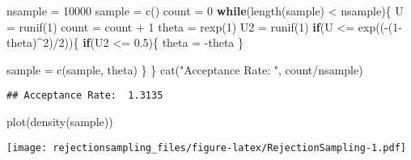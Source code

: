 \documentclass[
]{article}
\newenvironment{Shaded}{\begin{snugshade}}{\end{snugshade}}
\newcommand{\ControlFlowTok}[1]{\textcolor[rgb]{0.13,0.29,0.53}{\textbf{#1}}}
\newcommand{\DecValTok}[1]{\textcolor[rgb]{0.00,0.00,0.81}{#1}}
\newcommand{\FloatTok}[1]{\textcolor[rgb]{0.00,0.00,0.81}{#1}}
\newcommand{\FunctionTok}[1]{\textcolor[rgb]{0.00,0.00,0.00}{#1}}
\newcommand{\NormalTok}[1]{#1}
\newcommand{\OtherTok}[1]{\textcolor[rgb]{0.56,0.35,0.01}{#1}}
\newcommand{\SpecialCharTok}[1]{\textcolor[rgb]{0.00,0.00,0.00}{#1}}
\newcommand{\StringTok}[1]{\textcolor[rgb]{0.31,0.60,0.02}{#1}}
\begin{document}
\begin{Shaded}
\begin{Highlighting}[]
\NormalTok{nsample }\OtherTok{=} \DecValTok{10000}
\NormalTok{sample }\OtherTok{=} \FunctionTok{c}\NormalTok{()}
\NormalTok{count }\OtherTok{=} \DecValTok{0}
\ControlFlowTok{while}\NormalTok{(}\FunctionTok{length}\NormalTok{(sample) }\SpecialCharTok{\textless{}}\NormalTok{ nsample)\{}
\NormalTok{  U }\OtherTok{=} \FunctionTok{runif}\NormalTok{(}\DecValTok{1}\NormalTok{)}
\NormalTok{  count }\OtherTok{=}\NormalTok{ count }\SpecialCharTok{+} \DecValTok{1}
\NormalTok{  theta }\OtherTok{=} \FunctionTok{rexp}\NormalTok{(}\DecValTok{1}\NormalTok{)}
\NormalTok{  U2 }\OtherTok{=} \FunctionTok{runif}\NormalTok{(}\DecValTok{1}\NormalTok{)}
  \ControlFlowTok{if}\NormalTok{(U }\SpecialCharTok{\textless{}=} \FunctionTok{exp}\NormalTok{((}\SpecialCharTok{{-}}\NormalTok{(}\DecValTok{1}\SpecialCharTok{{-}}\NormalTok{theta)}\SpecialCharTok{\^{}}\DecValTok{2}\NormalTok{)}\SpecialCharTok{/}\DecValTok{2}\NormalTok{))\{ }
    \ControlFlowTok{if}\NormalTok{(U2 }\SpecialCharTok{\textless{}=} \FloatTok{0.5}\NormalTok{)\{}
\NormalTok{      theta }\OtherTok{=} \SpecialCharTok{{-}}\NormalTok{theta}
\NormalTok{    \}}
    
\NormalTok{    sample }\OtherTok{=} \FunctionTok{c}\NormalTok{(sample, theta)}
\NormalTok{  \}}
\NormalTok{\}}
\FunctionTok{cat}\NormalTok{(}\StringTok{"Acceptance Rate: "}\NormalTok{, count}\SpecialCharTok{/}\NormalTok{nsample)}
\end{Highlighting}
\end{Shaded}

\begin{verbatim}
## Acceptance Rate:  1.3135
\end{verbatim}

\begin{Shaded}
\begin{Highlighting}[]
\FunctionTok{plot}\NormalTok{(}\FunctionTok{density}\NormalTok{(sample))}
\end{Highlighting}
\end{Shaded}

\texttt{[image: rejectionsampling\_files/figure-latex/RejectionSampling-1.pdf]}
\end{document}
